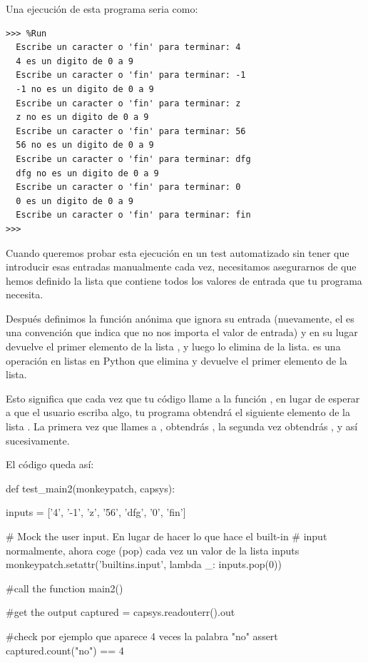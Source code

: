 Una ejecución de esta programa seria como:\\

\begin{Verbatim}[frame=single, label={\em ejemplos de test}]
>>> %Run 
  Escribe un caracter o 'fin' para terminar: 4
  4 es un digito de 0 a 9
  Escribe un caracter o 'fin' para terminar: -1
  -1 no es un digito de 0 a 9
  Escribe un caracter o 'fin' para terminar: z
  z no es un digito de 0 a 9
  Escribe un caracter o 'fin' para terminar: 56
  56 no es un digito de 0 a 9
  Escribe un caracter o 'fin' para terminar: dfg
  dfg no es un digito de 0 a 9
  Escribe un caracter o 'fin' para terminar: 0
  0 es un digito de 0 a 9
  Escribe un caracter o 'fin' para terminar: fin
>>>    
\end{Verbatim}

Cuando queremos probar esta ejecución en un test automatizado sin tener que introducir esas entradas manualmente cada vez, necesitamos asegurarnos de que hemos definido la lista  que contiene todos los valores de entrada que tu programa necesita.

Después definimos la función anónima  que ignora su entrada (nuevamente, el \pythoninline{_} es una convención que indica que no nos importa el valor de entrada) y en su lugar devuelve el primer elemento de la lista , y luego lo elimina de la lista.  es una operación en listas en Python que elimina y devuelve el primer elemento de la lista.

Esto significa que cada vez que tu código llame a la función , en lugar de esperar a que el usuario escriba algo, tu programa obtendrá el siguiente elemento de la lista . La primera vez que llames a , obtendrás , la segunda vez obtendrás , y así sucesivamente.

El código queda así:

\begin{small}
\begin{python}
def test_main2(monkeypatch, capsys): 
    
    inputs = ['4', '-1', 'z', '56', 'dfg', '0', 'fin'] 
    
    # Mock the user input. En lugar de hacer lo que hace el built-in
    # input normalmente, ahora coge (pop) cada vez un valor de la lista inputs
    monkeypatch.setattr('builtins.input', lambda _: inputs.pop(0))
    
    #call the function
    main2()
    
    #get the output
    captured = capsys.readouterr().out
    
    #check por ejemplo que aparece 4 veces la palabra "no"
    assert captured.count("no") == 4
\end{python}
\end{small}




